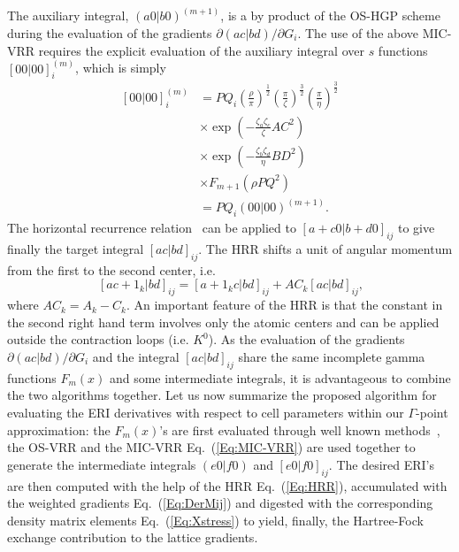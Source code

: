 \documentclass[prl,twocolumn,showpacs,twocolumngrid,superbib]{revtex4}
\begin{document}
The auxiliary integral, $(a0|b0)^{(m+1)}$, is a by product of the OS-HGP scheme during
the evaluation of the gradients $\partial (ac|bd)/\partial G_i$.
The use of the above MIC-VRR requires the explicit evaluation of the auxiliary integral
over $s$ functions $[00|00]_{i}^{(m)}$, which is simply
\begin{equation*}
  \begin{split}
    [00|00]_{i}^{(m)}&=
    PQ_i \left(\frac{\rho}{\pi}\right)^{\frac{1}{2}}
    \left(\frac{\pi}{\zeta}\right)^{\frac{3}{2}}\left(\frac{\pi}{\eta}\right)^{\frac{3}{2}}\\
    &\times\exp\left(-\frac{\zeta_a\zeta_c}{\zeta}AC^2\right) \\
    &\times\exp\left(-\frac{\zeta_b\zeta_d}{\eta}BD^2\right) \\
    &\times F_{m+1}(\rho PQ^2) \\
    &=PQ_i(00|00)^{(m+1)}.
  \end{split}
\end{equation*}
The horizontal recurrence relation~\cite{MGordon88} can be applied to $[a+c0|b+d0]_{ij}$ to give 
finally the target integral $[ac|bd]_{ij}$.
The HRR shifts a unit of angular momentum from the first to the second center, i.e.
\begin{equation}~\label{Eq:HRR}
  [ac+1_k|bd]_{ij}=[a+1_kc|bd]_{ij}+AC_k[ac|bd]_{ij},
\end{equation}
where $AC_k=A_k-C_k$. An important feature of the HRR is that the 
constant in the second right hand term involves only the atomic centers
and can be applied outside the contraction loops (i.e. $K^0$).
As the evaluation of the gradients $\partial (ac|bd)/\partial G_i$ and the integral
$[ac|bd]_{ij}$ share the same incomplete gamma functions 
$F_m(x)$ and some intermediate integrals, it is 
advantageous to combine the two algorithms together.
Let us now summarize the proposed algorithm for evaluating the ERI derivatives
with respect to cell parameters within our $\Gamma$-point approximation:
the $F_m(x)$'s are first evaluated through well known methods~\cite{LMcmurchie78,SObara86},
the OS-VRR and the MIC-VRR Eq.~(\ref{Eq:MIC-VRR}) are used together 
to generate the intermediate integrals $(e0|f0)$ and $[e0|f0]_{ij}$. The
desired ERI's are then computed with the help of the HRR Eq.~(\ref{Eq:HRR}),
accumulated with the weighted gradients Eq.~(\ref{Eq:DerMij}) and digested
with the corresponding density matrix elements Eq.~(\ref{Eq:Xstress}) to
yield, finally, the Hartree-Fock exchange contribution to the lattice gradients.
\end{document}
